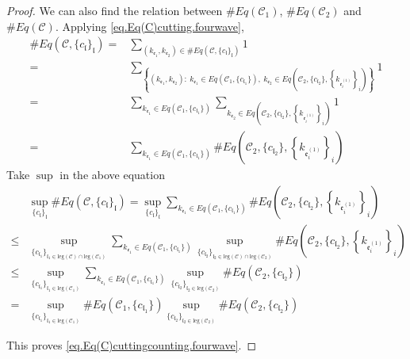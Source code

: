 \begin{proof}
We can also find the relation between $\#Eq(\mathcal{C}_1)$, $\#Eq(\mathcal{C}_2)$ and $\#Eq(\mathcal{C})$. Applying \eqref{eq.Eq(C)cutting.fourwave},
\begin{equation}
\begin{split}
 \#Eq(\mathcal{C},\{c_{\mathfrak{l}}\}_{\mathfrak{l}})=&\sum_{(k_{\mathfrak{e}_1},k_{\mathfrak{e}_{2}})\in \#Eq(\mathcal{C},\{c_{\mathfrak{l}}\}_{\mathfrak{l}})} 1
 \\
 =&\sum_{\left\{(k_{\mathfrak{e}_1},k_{\mathfrak{e}_{2}}):\ k_{\mathfrak{e}_1}\in Eq(\mathcal{C}_1,\{c_{\mathfrak{l}_1}\}),\  k_{\mathfrak{e}_{2}}\in Eq\left(\mathcal{C}_{2}, \{c_{\mathfrak{l}_2}\}, \left\{k_{\mathfrak{e}_{i}^{(1)}}\right\}_{i}\right)\right\}} 1
 \\
 =&\sum_{k_{\mathfrak{e}_1}\in Eq(\mathcal{C}_1,\{c_{\mathfrak{l}_1}\})} \sum_{k_{\mathfrak{e}_{2}}\in Eq\left(\mathcal{C}_{2}, \{c_{\mathfrak{l}_2}\}, \left\{k_{\mathfrak{e}_{i}^{(1)}}\right\}_{i}\right)} 1
 \\
 =&\sum_{k_{\mathfrak{e}_1}\in Eq(\mathcal{C}_1,\{c_{\mathfrak{l}_1}\})} \# Eq\left(\mathcal{C}_{2}, \{c_{\mathfrak{l}_2}\}, \left\{k_{\mathfrak{e}_{i}^{(1)}}\right\}_{i}\right)
\end{split}
\end{equation}
Take $\sup$ in the above equation
\begin{equation}
\begin{split}
 &\sup_{\{c_{\mathfrak{l}}\}_{\mathfrak{l}}}\#Eq(\mathcal{C},\{c_{\mathfrak{l}}\}_{\mathfrak{l}})
 =\sup_{\{c_{\mathfrak{l}}\}_{\mathfrak{l}}}\sum_{k_{\mathfrak{e}_1}\in Eq(\mathcal{C}_1,\{c_{\mathfrak{l}_1}\})} \# Eq\left(\mathcal{C}_{2}, \{c_{\mathfrak{l}_2}\}, \left\{k_{\mathfrak{e}_{i}^{(1)}}\right\}_{i}\right)
 \\
 \le &\sup_{\{c_{\mathfrak{l}_1}\}_{\mathfrak{l}_1\in \text{leg}(\mathcal{C})\cap \text{leg}(\mathcal{C}_1)} }\sum_{k_{\mathfrak{e}_1}\in Eq(\mathcal{C}_1,\{c_{\mathfrak{l}_1}\})} \sup_{\{c_{\mathfrak{l}_2}\}_{\mathfrak{l}_2\in \text{leg}(\mathcal{C})\cap \text{leg}(\mathcal{C}_2)} }\# Eq\left(\mathcal{C}_{2}, \{c_{\mathfrak{l}_2}\}, \left\{k_{\mathfrak{e}_{i}^{(1)}}\right\}_{i}\right)
 \\
 \le &\sup_{\{c_{\mathfrak{l}_1}\}_{\mathfrak{l}_1\in \text{leg}(\mathcal{C}_1)} }\sum_{k_{\mathfrak{e}_1}\in Eq(\mathcal{C}_1,\{c_{\mathfrak{l}_1}\})} \sup_{\{c_{\mathfrak{l}_2}\}_{\mathfrak{l}_2\in \text{leg}(\mathcal{C}_2)} }\# Eq(\mathcal{C}_{2}, \{c_{\mathfrak{l}_2}\})
 \\
 = &\sup_{\{c_{\mathfrak{l}_1}\}_{\mathfrak{l}_1\in \text{leg}(\mathcal{C}_1)} } \# Eq(\mathcal{C}_1,\{c_{\mathfrak{l}_1}\}) \sup_{\{c_{\mathfrak{l}_2}\}_{\mathfrak{l}_2\in \text{leg}(\mathcal{C}_2)} }\# Eq(\mathcal{C}_{2}, \{c_{\mathfrak{l}_2}\})
\end{split}
\end{equation}

This proves \eqref{eq.Eq(C)cuttingcounting.fourwave}.
\end{proof}



